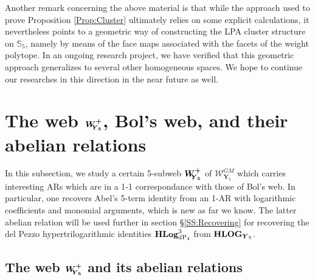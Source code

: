 \documentclass[11pt]{amsart}
\newcommand{\bk}{\bigskip}
\begin{document}
Another remark concerning the above material is that while the  approach used to prove Proposition \ref{Prop:Cluster} ultimately relies on some explicit calculations, it  nevertheless points to a geometric way of constructing the LPA cluster structure on $\mathbb S_5$, namely by means of the face maps associated with the facets of the weight polytope. In an ongoing research project, we have verified that this geometric approach generalizes to several other homogeneous spaces. We hope to continue our researches in this direction in the near future as well. 
 
 

\section{\bf The web $\boldsymbol{W^{+}_{\hspace{-0.1cm} \boldsymbol{Y}_5}}$, Bol's web, and their abelian relations}
\label{SS:WGM-+-Bol's-Web}
In this subsection, we study a certain 5-subweb $\boldsymbol{W^{+}_{\hspace{-0.1cm} \boldsymbol{Y}_5}}$ of $\boldsymbol{\mathcal W}_{\boldsymbol{Y}_5}^{GM}$ which carries interesting ARs which are in a 1-1 correspondance with those of Bol's web. In particular, one recovers Abel's 5-term identity from an 1-AR with logarithmic coefficients and monomial arguments, which is new as far we know.  The latter abelian relation will be used further in section \S\ref{SS:Recovering} for recovering the del Pezzo hypertrilogarithmic identities ${\bf HLog}_{{\rm dP}_4}^3$ from ${\bf HLOG}_{\boldsymbol{Y}_5}$. 
\bk

%
%
%
%

\subsection{\bf The web $\boldsymbol{W^{+}_{\hspace{-0.1cm} \boldsymbol{Y}_5}}$ and its abelian relations}
\end{document}
